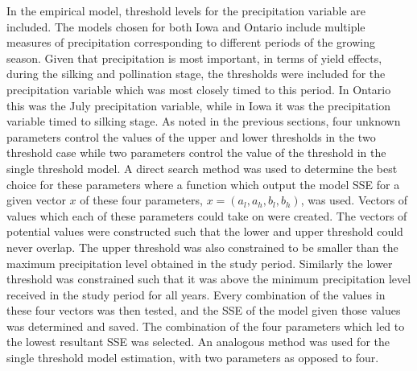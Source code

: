 In the empirical model, threshold levels for the precipitation variable are included. The models chosen for both Iowa and Ontario include multiple measures of precipitation corresponding to different periods of the growing season. Given that precipitation is most important, in terms of yield effects, during the silking and pollination stage, the thresholds were included for the precipitation variable which was most closely timed to this period. In Ontario this was the July precipitation variable, while in Iowa it was the precipitation variable timed to silking stage. As noted in the previous sections, four unknown parameters control the values of the upper and lower thresholds in the two threshold case while two parameters control the value of the threshold in the single threshold model. A direct search method was used to determine the best choice for these parameters where a function which output the model SSE for a given vector $x$ of these four parameters, $x=(a_l,a_h,b_l,b_h)$, was used. Vectors of values which each of these parameters could take on were created. The vectors of potential values were constructed such that the lower and upper threshold could never overlap. The upper threshold was also constrained to be smaller than the maximum precipitation level obtained in the study period. Similarly the lower threshold was constrained such that it was above the minimum precipitation level received in the study period for all years. Every combination of the values in these four vectors was then tested, and the SSE of the model given those values was determined and saved. The combination of the four parameters which led to the lowest resultant SSE was selected. An analogous method was used for the single threshold model estimation, with two parameters as opposed to four.